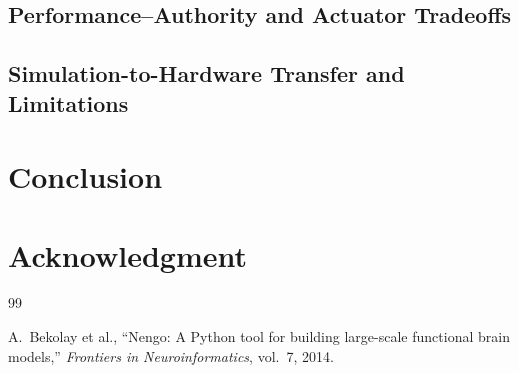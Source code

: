 \documentclass[letterpaper,10pt,conference]{ieeeconf}
\begin{document}
\subsection{Performance--Authority and Actuator Tradeoffs}


\subsection{Simulation-to-Hardware Transfer and Limitations}



\section{Conclusion}
\label{sec:conclusion}


\section*{Acknowledgment}


\begin{thebibliography}{99}


A.~Bekolay et al., ``Nengo: A Python tool for building large-scale functional
brain models,'' \emph{Frontiers in Neuroinformatics}, vol.~7, 2014.


\end{thebibliography}
\end{document}
